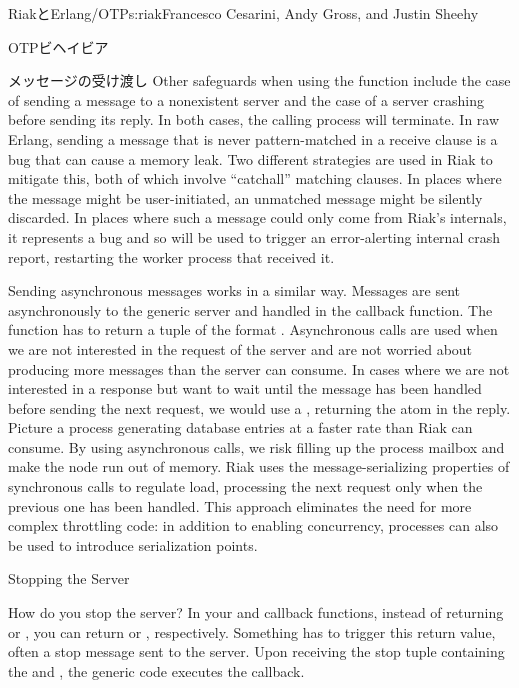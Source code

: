 \begin{aosachapter}{RiakとErlang/OTP}{s:riak}{Francesco Cesarini, Andy Gross, and Justin Sheehy}
\begin{aosasect1}{OTPビヘイビア}
\begin{aosasect2}{メッセージの受け渡し}
Other safeguards when using the  function
include the case of sending a message to a nonexistent server and
the case of a server crashing before sending its reply. In
both cases, the calling process will terminate. In raw Erlang, sending
a message that is never pattern-matched in a receive clause is a bug
that can cause a memory leak. Two different strategies are used in
Riak to mitigate this, both of which involve ``catchall'' matching
clauses.  In places where the message might be user-initiated, an
unmatched message might be silently discarded.  In places where such a
message could only come from Riak's internals, it represents a bug and
so will be used to trigger an error-alerting internal crash report,
restarting the worker process that received it.

Sending asynchronous messages works in a similar way. Messages are
sent asynchronously to the generic server and handled in the
 callback function. The function has to return a
tuple of the format . Asynchronous calls are
used when we are not interested in the request of the server and are
not worried about producing more messages than the server can
consume. In cases where we are not interested in a response but want
to wait until the message has been handled before sending the next
request, we would use a , returning the atom
 in the reply. Picture a process generating database entries
at a faster rate than Riak can consume. By using asynchronous calls,
we risk filling up the process mailbox and make the node run out of
memory.  Riak uses the message-serializing properties of synchronous
 calls to regulate load, processing the next request
only when the previous one has been handled.  This approach eliminates
the need for more complex throttling code: in addition to enabling
concurrency,  processes can also be used to
introduce serialization points.

\end{aosasect2}

\begin{aosasect2}{Stopping the Server}

How do you stop the server? In your  and
 callback functions, instead of returning
 or , you
can return  or , respectively. Something has to trigger this
return value, often a stop message sent to the server. Upon
receiving the stop tuple containing the  and
, the generic code executes the  callback.


\end{aosasect2}
\end{aosasect1}
\end{aosachapter}
